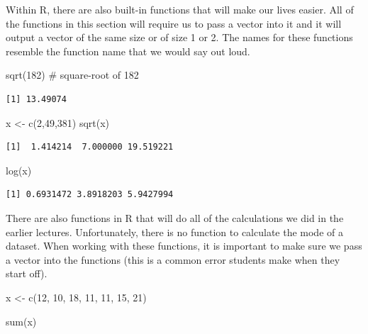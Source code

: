 \documentclass[
  letterpaper,
  DIV=11,
  numbers=noendperiod]{scrreprt}
\newenvironment{Shaded}{\begin{snugshade}}{\end{snugshade}}
\newcommand{\CommentTok}[1]{\textcolor[rgb]{0.37,0.37,0.37}{#1}}
\newcommand{\DecValTok}[1]{\textcolor[rgb]{0.68,0.00,0.00}{#1}}
\newcommand{\FunctionTok}[1]{\textcolor[rgb]{0.28,0.35,0.67}{#1}}
\newcommand{\NormalTok}[1]{\textcolor[rgb]{0.00,0.23,0.31}{#1}}
\newcommand{\OtherTok}[1]{\textcolor[rgb]{0.00,0.23,0.31}{#1}}
\begin{document}
Within R, there are also built-in functions that will make our lives
easier. All of the functions in this section will require us to pass a
vector into it and it will output a vector of the same size or of size 1
or 2. The names for these functions resemble the function name that we
would say out loud.

\begin{Shaded}
\begin{Highlighting}[]
\FunctionTok{sqrt}\NormalTok{(}\DecValTok{182}\NormalTok{) }\CommentTok{\# square{-}root of 182}
\end{Highlighting}
\end{Shaded}

\begin{verbatim}
[1] 13.49074
\end{verbatim}

\begin{Shaded}
\begin{Highlighting}[]
\NormalTok{x }\OtherTok{\textless{}{-}} \FunctionTok{c}\NormalTok{(}\DecValTok{2}\NormalTok{,}\DecValTok{49}\NormalTok{,}\DecValTok{381}\NormalTok{)}
\FunctionTok{sqrt}\NormalTok{(x)}
\end{Highlighting}
\end{Shaded}

\begin{verbatim}
[1]  1.414214  7.000000 19.519221
\end{verbatim}

\begin{Shaded}
\begin{Highlighting}[]
\FunctionTok{log}\NormalTok{(x)}
\end{Highlighting}
\end{Shaded}

\begin{verbatim}
[1] 0.6931472 3.8918203 5.9427994
\end{verbatim}

There are also functions in R that will do all of the calculations we
did in the earlier lectures. Unfortunately, there is no function to
calculate the mode of a dataset. When working with these functions, it
is important to make sure we pass a vector into the functions (this is a
common error students make when they start off).

\begin{Shaded}
\begin{Highlighting}[]
\NormalTok{x }\OtherTok{\textless{}{-}} \FunctionTok{c}\NormalTok{(}\DecValTok{12}\NormalTok{, }\DecValTok{10}\NormalTok{, }\DecValTok{18}\NormalTok{, }\DecValTok{11}\NormalTok{, }\DecValTok{11}\NormalTok{, }\DecValTok{15}\NormalTok{, }\DecValTok{21}\NormalTok{)}

\FunctionTok{sum}\NormalTok{(x)}
\end{Highlighting}
\end{Shaded}
\end{document}

